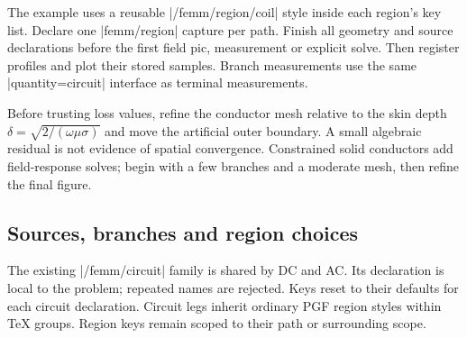 
The example uses a reusable |/femm/region/coil| style inside each region's key
list. Declare one |femm/region| capture per path. Finish all geometry and source
declarations before the first field pic, measurement or explicit solve. Then
register profiles and plot their stored samples. Branch measurements use the
same |quantity=circuit| interface as terminal measurements.

Before trusting loss values, refine the conductor mesh relative to the skin
depth $\delta=\sqrt{2/(\omega\mu\sigma)}$ and move the artificial outer boundary.
A small algebraic residual is not evidence of spatial convergence. Constrained
solid conductors add field-response solves; begin with a few branches and a
moderate mesh, then refine the final figure.

\subsection{Sources, branches and region choices}
The existing |/femm/circuit| family is shared by DC and AC. Its declaration is
local to the problem; repeated names are rejected. Keys reset to their defaults
for each circuit declaration. Circuit legs inherit ordinary PGF region styles
within TeX groups. Region keys remain scoped to their path or surrounding scope.

